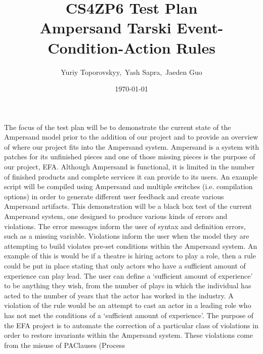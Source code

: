 \documentclass[12pt]{article}
\begin{document}
\title{CS4ZP6 Test Plan \\ Ampersand Tarski Event-Condition-Action 
Rules \\ \vspace{-1ex}} 
\author{\normalsize{Yuriy Toporovskyy,\ Yash Sapra,\ Jaeden Guo}}
\date{\normalsize\today \vspace{-3ex}}
\thispagestyle{empty}
\maketitle
\paragraph{}
The focus of the test plan will be to demonstrate the current state of the 
Ampersand model prior to the addition of our project and to provide an overview 
of where our project fits into the Ampersand system. Ampersand is a system with 
patches for its unfinished pieces and one of those missing pieces is the 
purpose of our project, EFA. Although Ampersand is functional, it is limited in 
the number of finished products and complete services it can provide to its 
users. An example script will be compiled using Ampersand and multiple switches 
(i.e. compilation options) in order to generate different user feedback and 
create various Ampersand artifacts. 
\newline
\indent This demonstration will be a black box test of the current Ampersand 
system, one designed to produce various kinds of errors and violations. The 
error messages inform the user of syntax and definition errors, such as a 
missing variable. Violations inform the user when the model they are attempting 
to build violates pre-set conditions within the Ampersand system. An example of 
this is would be if a theatre is hiring actors to play a role, then a rule 
could be put in place stating that only actors who have a sufficient amount of 
experience can play lead. The user can define a ‘sufficient amount of 
experience’ to be anything they wish, from the number of plays in which the 
individual has acted to the number of years that the actor has worked in the 
industry. A violation of the rule would be an attempt to cast an actor in a 
leading role who has not met the conditions of a ‘sufficient amount of 
experience’. 
\newline
\indent The purpose of the EFA project is to automate the correction of a 
particular class of violations in order to restore invariants within the 
Ampersand system. These violations come from the misuse of PAClauses (Process 
\end{document}
